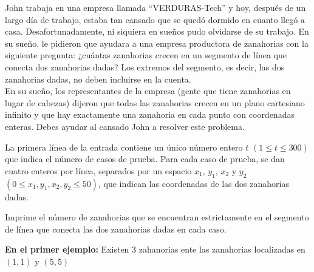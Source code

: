 
John trabaja en una empresa llamada ``VERDURAS-Tech'' y hoy, después de un largo día de trabajo, estaba tan cansado que se quedó dormido en cuanto llegó a casa. Desafortunadamente, ni siquiera en sueños pudo olvidarse de su trabajo. En su sueño, le pidieron que ayudara a una empresa productora de zanahorias con la siguiente pregunta: ¿cuántas zanahorias crecen en un segmento de línea que conecta dos zanahorias dadas? Los extremos del segmento, es decir, las dos zanahorias dadas, no deben incluirse en la cuenta. \\

En su sueño, los representantes de la empresa (gente que tiene zanahorias en lugar de cabezas) dijeron que todas las zanahorias crecen en un plano cartesiano infinito y que hay exactamente una zanahoria en cada punto con coordenadas enteras. Debes ayudar al cansado John a resolver este problema.


La primera línea de la entrada contiene un único número entero $t$ $(1 \le t \le 300)$ que indica el número de casos de prueba. Para cada caso de prueba, se dan cuatro enteros por línea, separados por un espacio $x_1$, $y_1$, $x_2$ y $y_2$ $(0 \leq x_1, y_1, x_2, y_2 \leq 50)$, que indican las coordenadas de las dos zanahorias dadas.

\outputText

Imprime el número de zanahorias que se encuentran estrictamente en el segmento de línea que conecta las dos zanahorias dadas en cada caso.

\exampleCases

\begin{example}
\end{example}

\explanationText

\textbf{En el primer ejemplo:} Existen $3$ zahanorias ente las zanahorias localizadas en $(1,1)$ y $(5, 5)$

\begin{figure}[h]
    \centering
    
\end{figure}